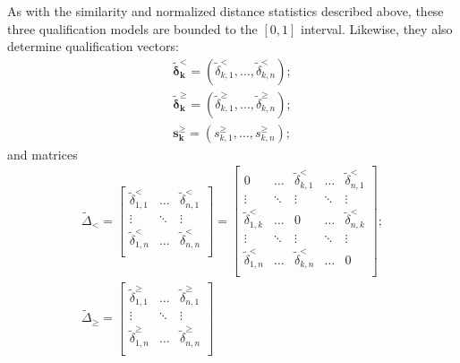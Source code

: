 \documentclass{elsarticle} %
\begin{document}
As with the similarity and normalized distance statistics described above,
these three qualification models are bounded to the $[0,1]$ interval. Likewise,
they also determine qualification vectors:
\begin{gather}
    \boldsymbol{\tilde{\delta}_{k}^{<}} = (\tilde{\delta}_{k,1}^{<}, \dots, \tilde{\delta}_{k,n}^{<})
    ;\\
    \boldsymbol{\tilde{\delta}_{k}^{\geq}} = (\tilde{\delta}_{k,1}^{\geq}, \dots, \tilde{\delta}_{k,n}^{\geq})
    ;\\
    \boldsymbol{s_{k}^{\geq}} = (s_{k,1}^{\geq}, \dots, s_{k,n}^{\geq})
    ;
\end{gather}
and matrices
\begin{gather}
    \textbf{$\tilde{\Delta}$}_{\boldsymbol{<}} =
    \begin{bmatrix}
        \tilde{\delta}_{1,1}^{<} & \hdots & \tilde{\delta}_{n,1}^{<} \\
        \vdots                   & \ddots & \vdots                   \\
        \tilde{\delta}_{1,n}^{<} & \hdots & \tilde{\delta}_{n,n}^{<} \\
    \end{bmatrix} =
    \begin{bmatrix}
        0                        & \hdots & \tilde{\delta}_{k,1}^{<} & \hdots & \tilde{\delta}_{n,1}^{<} \\
        \vdots                   & \ddots & \vdots                   & \ddots & \vdots                   \\
        \tilde{\delta}_{1,k}^{<} & \hdots & 0                        & \hdots & \tilde{\delta}_{n,k}^{<} \\
        \vdots                   & \ddots & \vdots                   & \ddots & \vdots                   \\
        \tilde{\delta}_{1,n}^{<} & \hdots & \tilde{\delta}_{k,n}^{<} & \hdots & 0                        \\
    \end{bmatrix}
    ;\\
    \textbf{$\tilde{\Delta}$}_{\boldsymbol{\geq}} =
    \begin{bmatrix}
        \tilde{\delta}_{1,1}^{\geq} & \hdots & \tilde{\delta}_{n,1}^{\geq} \\
        \vdots                      & \ddots & \vdots                      \\
        \tilde{\delta}_{1,n}^{\geq} & \hdots & \tilde{\delta}_{n,n}^{\geq} \\

\end{bmatrix}
\end{gather}
\end{document}
